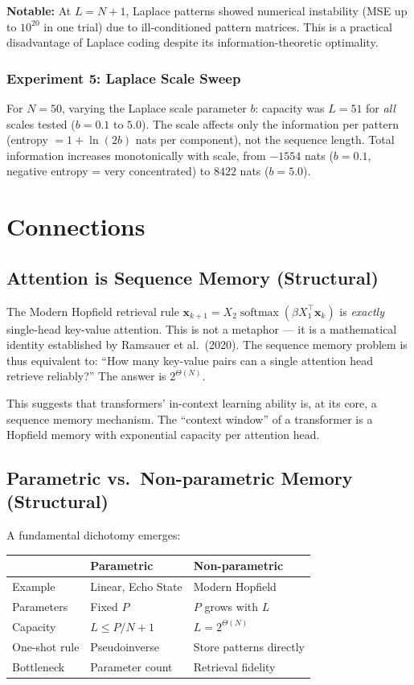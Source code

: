 \documentclass[11pt]{article}
\theoremstyle{definition}
\theoremstyle{remark}
\begin{document}
\textbf{Notable:} At $L = N + 1$, Laplace patterns showed numerical instability (MSE up to $10^{20}$ in one trial) due to ill-conditioned pattern matrices. This is a practical disadvantage of Laplace coding despite its information-theoretic optimality.

\subsubsection{Experiment 5: Laplace Scale Sweep}

For $N = 50$, varying the Laplace scale parameter $b$: capacity was $L = 51$ for \emph{all} scales tested ($b = 0.1$ to $5.0$). The scale affects only the information per pattern (entropy $= 1 + \ln(2b)$ nats per component), not the sequence length. Total information increases monotonically with scale, from $-1554$ nats ($b = 0.1$, negative entropy = very concentrated) to $8422$ nats ($b = 5.0$).

\section{Connections}

\subsection{Attention is Sequence Memory (Structural)}

The Modern Hopfield retrieval rule $\mathbf{x}_{k+1} = X_2 \operatorname{softmax}(\beta X_1^\top \mathbf{x}_k)$ is \emph{exactly} single-head key-value attention. This is not a metaphor --- it is a mathematical identity established by Ramsauer et al.\ (2020). The sequence memory problem is thus equivalent to: ``How many key-value pairs can a single attention head retrieve reliably?'' The answer is $2^{\Theta(N)}$.

This suggests that transformers' in-context learning ability is, at its core, a sequence memory mechanism. The ``context window'' of a transformer is a Hopfield memory with exponential capacity per attention head.

\subsection{Parametric vs.\ Non-parametric Memory (Structural)}

A fundamental dichotomy emerges:

\begin{center}
\begin{tabular}{lll}
\toprule
& \textbf{Parametric} & \textbf{Non-parametric} \\
\midrule
Example & Linear, Echo State & Modern Hopfield \\
Parameters & Fixed $P$ & $P$ grows with $L$ \\
Capacity & $L \leq P/N + 1$ & $L = 2^{\Theta(N)}$ \\
One-shot rule & Pseudoinverse & Store patterns directly \\
Bottleneck & Parameter count & Retrieval fidelity \\
\bottomrule
\end{tabular}
\end{center}
\end{document}

